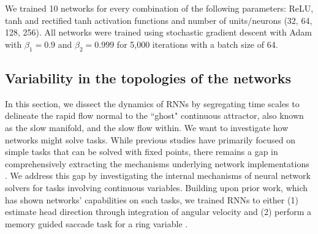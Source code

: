 \documentclass{article} %
\newcounter{ct}
\theoremstyle{definition}
\theoremstyle{remark}
\begin{document}
We trained 10 networks for every combination of the following parameters:
 ReLU, tanh and rectified tanh activation functions and
 number of units/neurons (32, 64, 128, 256).
%
All networks were trained using stochastic gradient descent with Adam with $\beta_1=0.9$ and $\beta_2=0.999$  for  5,000 iterations with a batch size of 64. %




\subsection{Variability in the topologies of the networks}\label{sec:fastslowmethod}
In this section, we dissect the dynamics of RNNs by segregating time scales to delineate the rapid flow normal to the ``ghost" continuous attractor, also known as the slow manifold, and the slow flow within.
We want to investigate how networks might solve tasks.
While previous studies have primarily focused on simple tasks that can be solved with fixed points, there remains a gap in comprehensively extracting the mechanisms underlying network implementations \citep{sussillo2013blackbox}.
We address this gap by investigating the internal mechanisms of neural network solvers for tasks involving continuous variables. Building upon prior work, which has shown networks' capabilities on such tasks, we trained RNNs to either
(1) estimate head direction through integration of angular velocity \citep{cueva2019headdirection, cueva2021continuous}
and (2) perform a memory guided saccade task for a ring variable \citep{wimmer2014}.
\end{document}
